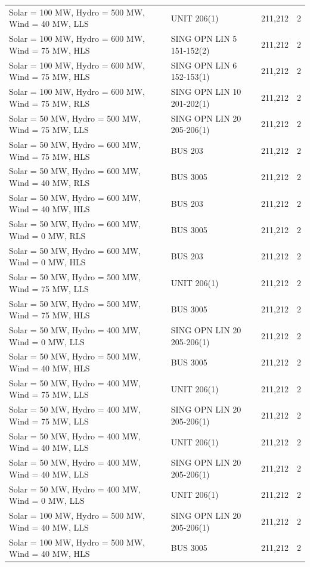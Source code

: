 \documentclass[10pt]{report}
\begin{document}
\begin{table}[H]
{\begin{tabular}{lllr}
Solar = 100 MW, Hydro = 500 MW, Wind = 40 MW, LLS & UNIT 206(1) & 211,212 & 2 \\
Solar = 100 MW, Hydro = 600 MW, Wind = 75 MW, HLS & SING OPN LIN   5 151-152(2) & 211,212 & 2 \\
Solar = 100 MW, Hydro = 600 MW, Wind = 75 MW, HLS & SING OPN LIN   6 152-153(1) & 211,212 & 2 \\
Solar = 100 MW, Hydro = 600 MW, Wind = 75 MW, RLS & SING OPN LIN   10 201-202(1) & 211,212 & 2 \\
Solar = 50 MW, Hydro = 500 MW, Wind = 75 MW, LLS & SING OPN LIN   20 205-206(1) & 211,212 & 2 \\
Solar = 50 MW, Hydro = 600 MW, Wind = 75 MW, HLS & BUS 203 & 211,212 & 2 \\
Solar = 50 MW, Hydro = 600 MW, Wind = 40 MW, RLS & BUS 3005 & 211,212 & 2 \\
Solar = 50 MW, Hydro = 600 MW, Wind = 40 MW, HLS & BUS 203 & 211,212 & 2 \\
Solar = 50 MW, Hydro = 600 MW, Wind = 0 MW, RLS & BUS 3005 & 211,212 & 2 \\
Solar = 50 MW, Hydro = 600 MW, Wind = 0 MW, HLS & BUS 203 & 211,212 & 2 \\
Solar = 50 MW, Hydro = 500 MW, Wind = 75 MW, LLS & UNIT 206(1) & 211,212 & 2 \\
Solar = 50 MW, Hydro = 500 MW, Wind = 75 MW, HLS & BUS 3005 & 211,212 & 2 \\
Solar = 50 MW, Hydro = 400 MW, Wind = 0 MW, LLS & SING OPN LIN   20 205-206(1) & 211,212 & 2 \\
Solar = 50 MW, Hydro = 500 MW, Wind = 40 MW, HLS & BUS 3005 & 211,212 & 2 \\
Solar = 50 MW, Hydro = 400 MW, Wind = 75 MW, LLS & UNIT 206(1) & 211,212 & 2 \\
Solar = 50 MW, Hydro = 400 MW, Wind = 75 MW, LLS & SING OPN LIN   20 205-206(1) & 211,212 & 2 \\
Solar = 50 MW, Hydro = 400 MW, Wind = 40 MW, LLS & UNIT 206(1) & 211,212 & 2 \\
Solar = 50 MW, Hydro = 400 MW, Wind = 40 MW, LLS & SING OPN LIN   20 205-206(1) & 211,212 & 2 \\
Solar = 50 MW, Hydro = 400 MW, Wind = 0 MW, LLS & UNIT 206(1) & 211,212 & 2 \\
Solar = 100 MW, Hydro = 500 MW, Wind = 40 MW, LLS & SING OPN LIN   20 205-206(1) & 211,212 & 2 \\
Solar = 100 MW, Hydro = 500 MW, Wind = 40 MW, HLS & BUS 3005 & 211,212 & 2 \\

\end{tabular}}
\end{table}
\end{document}
